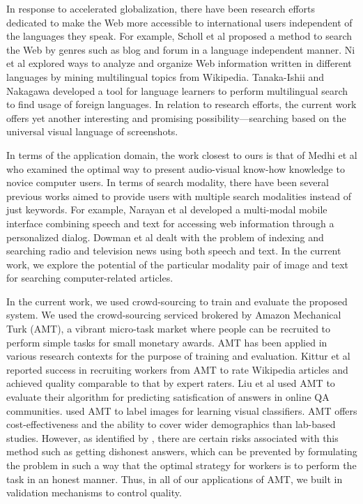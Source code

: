 \documentclass{www2010-submission}
\begin{document}
In response to accelerated globalization, there have been research
efforts dedicated to make the Web more accessible to international
users independent of the languages they speak. For example, Scholl et
al \cite{Scholl} proposed a method to search the Web by genres such as
blog and forum in a language independent manner. Ni et al \cite{Ni}
explored ways to analyze and organize Web information written in
different languages by mining multilingual topics from
Wikipedia. Tanaka-Ishii and Nakagawa \cite{Tanaka-Ishii} developed a
tool for language learners to perform multilingual search to find
usage of foreign languages. In relation to research efforts,
the current work offers yet another interesting and promising
possibility---searching based on the universal
visual language of screenshots.

In terms of the application domain, the work closest to ours is that
of Medhi et al \cite{Medhi} who examined the optimal way to present
audio-visual know-how knowledge to novice computer users.  In terms of
search modality, there have been several previous works aimed to
provide users with multiple search modalities instead of just
keywords. For example, Narayan et al \cite{Narayan} developed a
multi-modal mobile interface combining speech and text for accessing
web information through a personalized dialog.  Dowman et al
\cite{Dowman} dealt with the problem of indexing and searching radio
and television news using both speech and text. In the current work,
we explore the potential of the particular modality pair of image and
text for searching computer-related articles.


In the current work, we used crowd-sourcing to train and evaluate the
proposed system.  We used the crowd-sourcing serviced brokered by
Amazon Mechanical Turk (AMT), a vibrant micro-task market where people
can be recruited to perform simple tasks for small monetary
awards. AMT has been applied in various research contexts for the
purpose of training and evaluation. Kittur et al \cite{Kittur}
reported success in recruiting workers from AMT to rate Wikipedia
articles and achieved quality comparable to that by expert raters.
Liu et al \cite{Liu} used AMT to evaluate their algorithm for
predicting satisfication of answers in online QA
communities. \cite{Vijayanarasimha} used AMT to label images for
learning visual classifiers.  AMT offers cost-effectiveness and the ability
to cover wider demographics than lab-based studies. However, as
identified by \cite{Kittur}, there are certain risks associated with
this method such as getting dishonest answers, which can be prevented by
formulating the problem in such a way that the optimal strategy for workers is to
perform the task in an honest manner. Thus, in all of our
applications of AMT, we built in validation mechanisms to control
quality.
\end{document}
